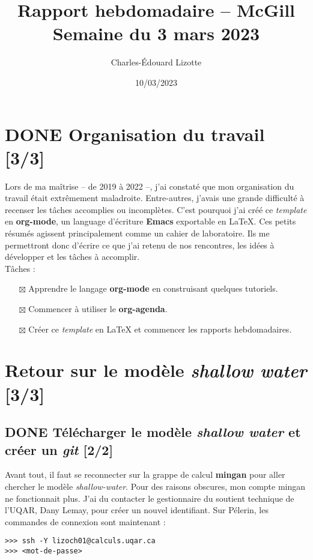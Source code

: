 \documentclass{article}
\author{Charles-Édouard Lizotte}
\date{10/03/2023}
\title{Rapport hebdomadaire -- McGill\\\medskip
\large Semaine du 3 mars 2023}
\numberwithin{equation}{section}
\begin{document}
\maketitle
\tableofcontents


\section{{\bfseries\sffamily DONE} Organisation du travail [3/3]}
\label{sec:orgb7234b3}
Lors de ma maîtrise -- de 2019 à 2022 --, j'ai constaté que mon organisation du travail était extrêmement maladroite.
Entre-autres, j'avais une grande difficulté à recenser les tâches accomplies ou incomplètes. 
C'est pourquoi j'ai créé ce \emph{template} en \textbf{org-mode}, un language d'écriture \textbf{Emacs} exportable en \LaTeX{}.
Ces petits résumés agissent principalement comme un cahier de laboratoire. 
Ils me permettront donc d'écrire ce que j'ai retenu de nos rencontres, les idées à développer et les tâches à accomplir.\\[0pt]

Tâches : 
\begin{itemize}
\item[{$\boxtimes$}] Apprendre le langage \textbf{org-mode} en construisant quelques tutoriels.
\item[{$\boxtimes$}] Commencer à utiliser le \textbf{org-agenda}.
\item[{$\boxtimes$}] Créer ce \emph{template} en \LaTeX{} et commencer les rapports hebdomadaires.
\end{itemize}

\section{Retour sur le modèle \emph{shallow water} [3/3]}
\label{sec:orge286cea}
\subsection{{\bfseries\sffamily DONE} Télécharger le modèle \emph{shallow water} et créer un \emph{git} [2/2]}
\label{sec:orgaba24d7}
Avant tout, il faut se reconnecter sur la grappe de calcul \textbf{mingan} pour aller chercher le modèle \emph{shallow-water}. 
Pour des raisons obscures, mon compte mingan ne fonctionnait plus.
J'ai du contacter le gestionnaire du soutient technique de l'UQAR, Dany Lemay, pour créer un nouvel identifiant. 
Sur Pélerin, les commandes de connexion sont maintenant : 
\begin{verbatim}
>>> ssh -Y lizoch01@calculs.uqar.ca
>>> <mot-de-passe>
\end{verbatim}
\end{document}
